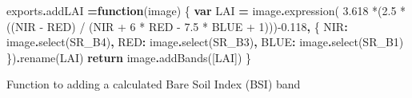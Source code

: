 \documentclass[
]{article}
\newenvironment{Shaded}{\begin{snugshade}}{\end{snugshade}}
\newcommand{\AttributeTok}[1]{\textcolor[rgb]{0.77,0.63,0.00}{#1}}
\newcommand{\ControlFlowTok}[1]{\textcolor[rgb]{0.13,0.29,0.53}{\textbf{#1}}}
\newcommand{\FunctionTok}[1]{\textcolor[rgb]{0.00,0.00,0.00}{#1}}
\newcommand{\KeywordTok}[1]{\textcolor[rgb]{0.13,0.29,0.53}{\textbf{#1}}}
\newcommand{\NormalTok}[1]{#1}
\newcommand{\OperatorTok}[1]{\textcolor[rgb]{0.81,0.36,0.00}{\textbf{#1}}}
\newcommand{\StringTok}[1]{\textcolor[rgb]{0.31,0.60,0.02}{#1}}
\begin{document}
\begin{Shaded}
\begin{Highlighting}[]
\NormalTok{exports}\OperatorTok{.}\AttributeTok{addLAI} \OperatorTok{=}\KeywordTok{function}\NormalTok{(image) \{}
  \KeywordTok{var}\NormalTok{ LAI }\OperatorTok{=}\NormalTok{ image}\OperatorTok{.}\FunctionTok{expression}\NormalTok{(}
        \StringTok{\textquotesingle{}3.618 *(2.5 * ((NIR {-} RED) / (NIR + 6 * RED {-} 7.5 * BLUE + 1))){-}0.118\textquotesingle{}}\OperatorTok{,}\NormalTok{ \{}
            \StringTok{\textquotesingle{}NIR\textquotesingle{}}\OperatorTok{:}\NormalTok{ image}\OperatorTok{.}\FunctionTok{select}\NormalTok{(}\StringTok{\textquotesingle{}SR\_B4\textquotesingle{}}\NormalTok{)}\OperatorTok{,}
            \StringTok{\textquotesingle{}RED\textquotesingle{}}\OperatorTok{:}\NormalTok{ image}\OperatorTok{.}\FunctionTok{select}\NormalTok{(}\StringTok{\textquotesingle{}SR\_B3\textquotesingle{}}\NormalTok{)}\OperatorTok{,}
            \StringTok{\textquotesingle{}BLUE\textquotesingle{}}\OperatorTok{:}\NormalTok{ image}\OperatorTok{.}\FunctionTok{select}\NormalTok{(}\StringTok{\textquotesingle{}SR\_B1\textquotesingle{}}\NormalTok{)}
\NormalTok{        \})}\OperatorTok{.}\FunctionTok{rename}\NormalTok{(}\StringTok{\textquotesingle{}LAI\textquotesingle{}}\NormalTok{)}
  \ControlFlowTok{return}\NormalTok{ image}\OperatorTok{.}\FunctionTok{addBands}\NormalTok{([LAI])}
\NormalTok{\} }
\end{Highlighting}
\end{Shaded}

Function to adding a calculated Bare Soil Index (BSI) band
\end{document}
